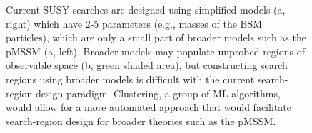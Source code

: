 \documentclass[letter, USenglish, 11pt, subfigure]{article}
\begin{document}
\begin{figure}[!htbp]
  \centering
  \hspace{3mm}
  \caption{Current SUSY searches are designed using simplified models (a, right) which have 2-5 parameters (e.g., masses of the BSM particles), which are only a small part of broader models such as the pMSSM (a, left). Broader models may populate unprobed regions of observable space (b, green shaded area), but constructing search regions using broader models is difficult with the current search-region design paradigm. Clustering, a group of ML algorithms, would allow for a more automated approach that would facilitate search-region design for broader theories such as the pMSSM.}
  \label{fig:modelCartoon}
\end{figure}
\end{document}
